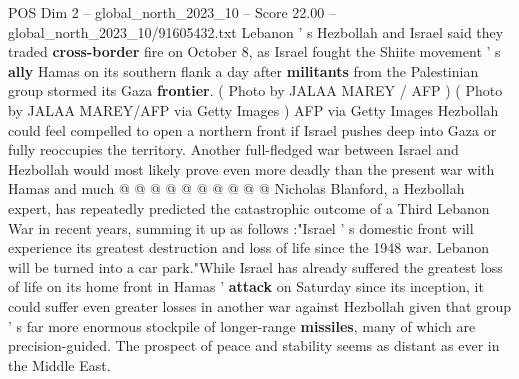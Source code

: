 \begin{textsample}{POS Dim 2 – global\_north\_2023\_10 – Score 22.00 – global\_north\_2023\_10/91605432.txt}
Lebanon ' s Hezbollah and Israel said they traded \textbf{cross-border} fire on October 8, as Israel fought the Shiite movement ' s \textbf{ally} Hamas on its southern flank a day after \textbf{militants} from the Palestinian group stormed its Gaza \textbf{frontier}. ( Photo by JALAA MAREY / AFP ) ( Photo by JALAA MAREY/AFP via Getty Images ) AFP via Getty Images Hezbollah could feel compelled to open a northern front if Israel pushes deep into Gaza or fully reoccupies the territory.
Another full-fledged war between Israel and Hezbollah would most likely prove even more deadly than the present war with Hamas and much @ @ @ @ @ @ @ @ @ @ Nicholas Blanford, a Hezbollah expert, has repeatedly predicted the catastrophic outcome of a Third Lebanon War in recent years, summing it up as follows :"Israel ' s domestic front will experience its greatest destruction and loss of life since the 1948 war.
Lebanon will be turned into a car park."While Israel has already suffered the greatest loss of life on its home front in Hamas ' \textbf{attack} on Saturday since its inception, it could suffer even greater losses in another war against Hezbollah given that group ' s far more enormous stockpile of longer-range \textbf{missiles}, many of which are precision-guided.
The prospect of peace and stability seems as distant as ever in the Middle East.

\end{textsample}
